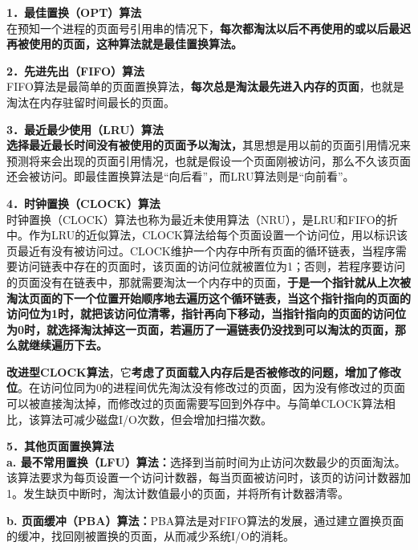 \textbf{{1．最佳置换（OPT）算法}}\\
在预知一个进程的页面号引用串的情况下，\textbf{每次都淘汰以后不再使用的或以后最迟再被使用的页面，这种算法就是最佳置换算法。}

\textbf{{2．先进先出（FIFO）算法}}\\
FIFO算法是最简单的页面置换算法，\textbf{每次总是淘汰最先进入内存的页面}，也就是淘汰在内存驻留时间最长的页面。

\textbf{{3．最近最少使用（LRU）算法}}\\
\textbf{选择最近最长时间没有被使用的页面予以淘汰，}其思想是用以前的页面引用情况来预测将来会出现的页面引用情况，也就是假设一个页面刚被访问，那么不久该页面还会被访问。即最佳置换算法是``向后看''，而LRU算法则是``向前看''。

\textbf{{4．时钟置换（CLOCK）算法}}\\
时钟置换（CLOCK）算法也称为最近未使用算法（NRU），是LRU和FIFO的折中。作为LRU的近似算法，CLOCK算法给每个页面设置一个访问位，用以标识该页最近有没有被访问过。CLOCK维护一个内存中所有页面的循环链表，当程序需要访问链表中存在的页面时，该页面的访问位就被置位为1；否则，若程序要访问的页面没有在链表中，那就需要淘汰一个内存中的页面，\textbf{于是一个指针就从上次被淘汰页面的下一个位置开始顺序地去遍历这个循环链表，当这个指针指向的页面的访问位为1时，就把该访问位清零，指针再向下移动，当指针指向的页面的访问位为0时，就选择淘汰掉这一页面，若遍历了一遍链表仍没找到可以淘汰的页面，那么就继续遍历下去。}

\textbf{改进型CLOCK算法}，它{\textbf{考虑了页面载入内存后是否被修改的问题，增加了修改位}}。在访问位同为0的进程间优先淘汰没有修改过的页面，因为没有修改过的页面可以被直接淘汰掉，而修改过的页面需要写回到外存中。与简单CLOCK算法相比，该算法可减少磁盘I/O次数，但会增加扫描次数。

\textbf{{5．其他页面置换算法}}\\
\textbf{a.
最不常用置换（LFU）算法：}选择到当前时间为止访问次数最少的页面淘汰。该算法要求为每页设置一个访问计数器，每当页面被访问时，该页的访问计数器加1。发生缺页中断时，淘汰计数值最小的页面，并将所有计数器清零。

\textbf{b.
页面缓冲（PBA）算法：}PBA算法是对FIFO算法的发展，通过建立置换页面的缓冲，找回刚被置换的页面，从而减少系统I/O的消耗。
